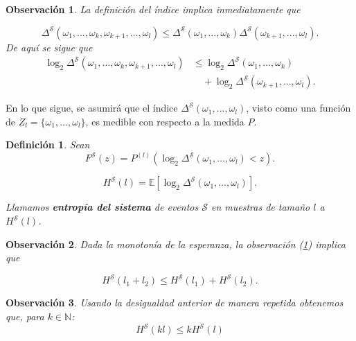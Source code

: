 \documentclass{report}
\newtheorem{dfn}{Definición}[section]
\newtheorem{obs}{Observación}[section]
\begin{document}
\begin{obs}\label{obs:desigualdad triangular indice de un sistema}
    La definición del índice implica inmediatamente que

    \begin{equation*}
    \Delta^{\mathcal{S}}(\omega_1, \dots, \omega_{k}, \omega_{k+1}, \dots,\omega_l) \leq \Delta^{\mathcal{S}}(\omega_1, \dots, \omega_k) \Delta^{\mathcal{S}}(\omega_{k+1}, \dots, \omega_l).
    \end{equation*}
    De aquí se sigue que
    \begin{equation*}
    \begin{aligned}
    \log_2 \Delta^{\mathcal{S}}(\omega_1, \dots, \omega_{k}, \omega_{k+1}, \dots,\omega_l)
    &\leq \log_2 \Delta^{\mathcal{S}}(\omega_1, \dots, \omega_k) \\
    &\quad + \log_2 \Delta^{\mathcal{S}}(\omega_{k+1}, \dots, \omega_l).
    \end{aligned}
    \end{equation*}
\end{obs}


En lo que sigue, se asumirá que el índice \( \Delta^{\mathcal{S}}(\omega_1, \dots, \omega_l) \), visto como una función de
\( Z_l = \{\omega_1, \dots, \omega_l\} \), es medible con respecto a la medida \( P \).

\begin{dfn}
    Sean
    \[
    F^{\mathcal{S}}(z) = P^{(l)}\left(\log_2 \Delta^{\mathcal{S}}(\omega_1, \dots, \omega_l) < z \right).
    \]

    \[
    H^{\mathcal{S}}(l) = \mathbb{E} \left[ \log_2 \Delta^{\mathcal{S}}(\omega_1, \dots, \omega_l) \right].
    \]

    Llamamos \textbf{entropía del sistema} de eventos \( \mathcal{S} \) en muestras de tamaño \( l \) a  $H^{\mathcal{S}}(l)$.

\end{dfn}

\begin{obs} \label{subaditividad de la entropia 1}
    Dada la monotonía de la esperanza, la observación (\ref{obs:desigualdad triangular indice de un sistema}) implica que

    \[
        H^{\mathcal{S}}(l_1 + l_2) \leq H^{\mathcal{S}}(l_1) + H^{\mathcal{S}}(l_2).
    \]
\end{obs}

\begin{obs} \label{subaditivdad de la entropia 2}
    Usando la desigualdad anterior de manera repetida obtenemos que, para $k\in \mathbb{N}$:
        \[
        H^{\mathcal{S}}(kl) \leq k H^{\mathcal{S}}(l)
    \]
\end{obs}
\end{document}
